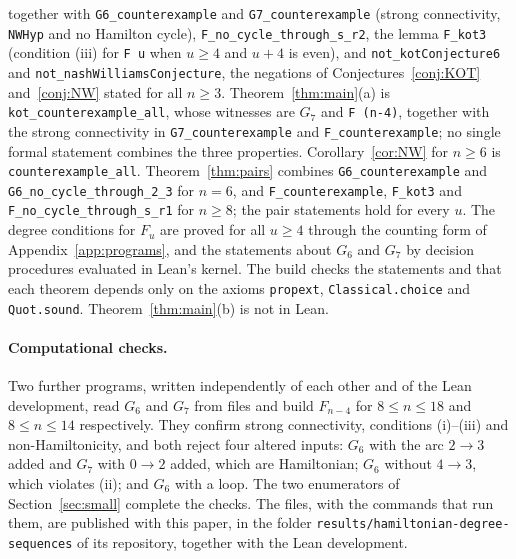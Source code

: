 \documentclass[11pt]{article}
\begin{document}
together with \texttt{G6\_counterexample} and \texttt{G7\_counterexample} (strong connectivity, \texttt{NWHyp} and no Hamilton cycle), \texttt{F\_no\_cycle\_through\_s\_r2}, the lemma \texttt{F\_kot3} (condition (iii) for \texttt{F u} when $u\ge4$ and $u+4$ is even), and \texttt{not\_kotConjecture6} and \texttt{not\_nashWilliamsConjecture}, the negations of Conjectures~\ref{conj:KOT} and~\ref{conj:NW} stated for all $n\ge3$. Theorem~\ref{thm:main}(a) is \texttt{kot\_counterexample\_all}, whose witnesses are $G_7$ and \texttt{F (n-4)}, together with the strong connectivity in \texttt{G7\_counterexample} and \texttt{F\_counterexample}; no single formal statement combines the three properties. Corollary~\ref{cor:NW} for $n\ge6$ is \texttt{counterexample\_all}. Theorem~\ref{thm:pairs} combines \texttt{G6\_counterexample} and \texttt{G6\_no\_cycle\_through\_2\_3} for $n=6$, and \texttt{F\_counterexample}, \texttt{F\_kot3} and \texttt{F\_no\_cycle\_through\_s\_r1} for $n\ge8$; the pair statements hold for every $u$. The degree conditions for $F_u$ are proved for all $u\ge4$ through the counting form of Appendix~\ref{app:programs}, and the statements about $G_6$ and $G_7$ by decision procedures evaluated in Lean's kernel. The build checks the statements and that each theorem depends only on the axioms \texttt{propext}, \texttt{Classical.choice} and \texttt{Quot.sound}. Theorem~\ref{thm:main}(b) is not in Lean.

\paragraph{Computational checks.} Two further programs, written independently of each other and of the Lean development, read $G_6$ and $G_7$ from files and build $F_{n-4}$ for $8\le n\le18$ and $8\le n\le14$ respectively. They confirm strong connectivity, conditions (i)--(iii) and non-Hamiltonicity, and both reject four altered inputs: $G_6$ with the arc $2\to3$ added and $G_7$ with $0\to2$ added, which are Hamiltonian; $G_6$ without $4\to3$, which violates (ii); and $G_6$ with a loop. The two enumerators of Section~\ref{sec:small} complete the checks. The files, with the commands that run them, are published with this paper, in the folder \texttt{results/hamiltonian-degree-sequences} of its repository, together with the Lean development.
\end{document}
